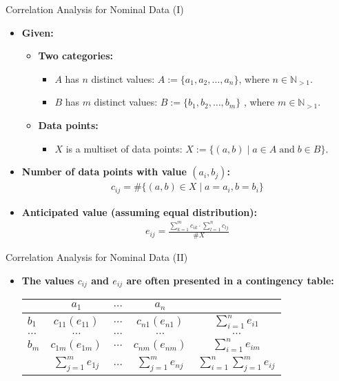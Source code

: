 \begin{frame}{Correlation Analysis for Nominal Data (I)}
	\begin{itemize}
		\item \textbf{Given:}
		\begin{itemize}
			\item \textbf{Two categories:}
			\begin{itemize}
				\item $A$ has $n$ distinct values: $A := \{a_1, a_2, \ldots, 
				a_n\}$, where $n \in \mathbb{N}_{>1}$.
				\item $B$ has $m$ distinct values: $B := \{b_1, b_2, \ldots, 
				b_m\}$ 
				, where $m \in \mathbb{N}_{>1}$.
			\end{itemize}
			\item \textbf{Data points:}
			\begin{itemize}
				\item $X$ is a multiset of data points: $X := \{(a, b) 
				\; \vert \; a \in A \; \text{and} \; b \in B\}$.
			\end{itemize}
		\end{itemize}
		\item \textbf{Number of data points with value $(a_i,b_j)$:}
		\begin{align}
			c_{ij} = \#\{(a,b) \in X \mid a = a_i, b= b_i\}
		\end{align}
		\item \textbf{Anticipated value (assuming equal distribution):}
		\begin{align}
			e_{ij} = \frac{\sum_{k=1}^{m} c_{ik} \cdot \sum_{l=1}^{n}c_{lj}}{\#X}
		\end{align}
	\end{itemize}
\end{frame}

\begin{frame}{Correlation Analysis for Nominal Data (II)}
	\begin{itemize}
		\item \textbf{The values $c_{ij}$ and $e_{ij}$ are often presented in a 
		\color{airforceblue}contingency table:} \\
		\centering
		\vspace{5mm}
		\begin{tabular}{l|c|c|c|c|}
			& $a_1$ & $\ldots$ & $a_n$ &  
			\\\hline
			$b_1$ & $c_{11} (e_{11})$ & $\ldots$ & $c_{n1} (e_{n1})$ & 
			$\sum_{i=1}^n e_{i1}$  
			\\\hline
			$\ldots$ & $\ldots$ & $\ldots$ 	& $\ldots$ & $\ldots$ 
			\\\hline
			$b_m$ & $c_{1m} (e_{1m})$ & $\ldots$ & $c_{nm} (e_{nm})$ & 
			$\sum_{i=1}^n e_{im}$  
			\\\hline
			& $\sum_{j=1}^m e_{1j}$ & $\ldots$ & $\sum_{j=1}^m 
			e_{nj}$ &  $\sum_{i=1}^n\sum_{j=1}^m e_{ij}$
			\\\hline
		\end{tabular}
	\end{itemize}
\end{frame}

